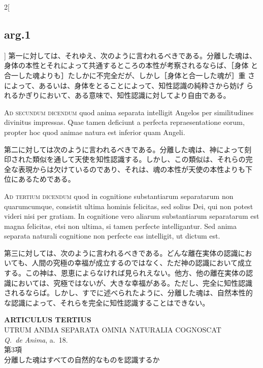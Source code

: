 \documentclass[paper=a4paper,fontsize=10pt,jafontsize=9pt,titlepage]{jlreq}
\begin{document}
\begin{paracol}{2}[\subsection{arg.1}]
第一に対しては、それゆえ、次のように言われるべきである。分離した魂は、
身体の本性とそれによって共通するところの本性が考察されるならば、［身体
と合一した魂よりも］たしかに不完全だが、しかし［身体と合一した魂が］重
さによって、あるいは、身体をとることによって、知性認識の純粋さから妨げ
られるかぎりにおいて、ある意味で、知性認識に対してより自由である。

\switchcolumn*[\subsection{ad.2}]

{\scshape Ad secundum dicendum} quod anima separata intelligit Angelos per
similitudines divinitus impressas. Quae tamen deficiunt a perfecta
repraesentatione eorum, propter hoc quod animae natura est inferior
quam Angeli.

\switchcolumn

第二に対しては次のように言われるべきである。分離した魂は、神によって刻
印された類似を通して天使を知性認識する。しかし、この類似は、それらの完
全な表現からは欠けているのであり、それは、魂の本性が天使の本性よりも下
位にあるためである。

\switchcolumn*[\subsection{ad.3}]

{\scshape Ad tertium dicendum} quod in cognitione substantiarum separatarum
non quarumcumque, consistit ultima hominis felicitas, sed solius Dei,
qui non potest videri nisi per gratiam. In cognitione vero aliarum
substantiarum separatarum est magna felicitas, etsi non ultima, si
tamen perfecte intelligantur. Sed anima separata naturali cognitione
non perfecte eas intelligit, ut dictum est.

\switchcolumn

第三に対しては、次のように言われるべきである。どんな離在実体の認識にお
いても、人間の究極の幸福が成立するのではなく、ただ神の認識において成立
する。この神は、恩恵によらなければ見られえない。他方、他の離在実体の認
識においては、究極ではないが、大きな幸福がある。ただし、完全に知性認識
されるならば。しかし、すでに述べられたように、分離した魂は、自然本性的
な認識によって、それらを完全に知性認識することはできない。

\end{paracol}

\newpage
{}

{}
\setcounter{section}{3}
\setcounter{subsection}{0}
\begin{center}
{\Large {\bfseries ARTICULUS TERTIUS}}\\ {\large UTRUM ANIMA SEPARATA OMNIA
NATURALIA COGNOSCAT}\\ {\footnotesize {\itshape Q.~de Anima}, a.~18.}\\
{\Large 第3項\\分離した魂はすべての自然的なものを認識するか}
\end{center}
\end{document}
